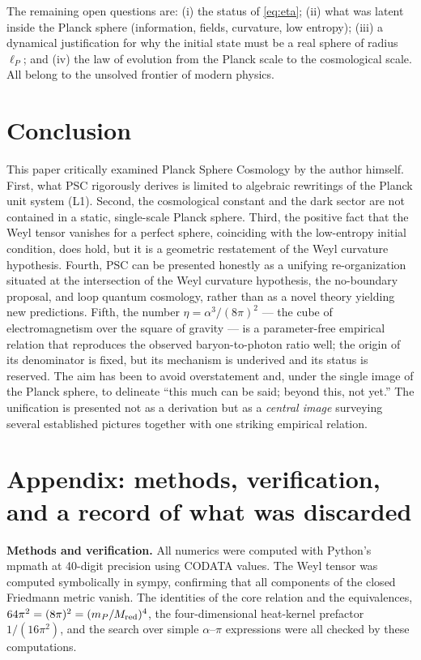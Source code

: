 \documentclass[11pt,a4paper]{article}
\newcommand{\eP}{\ell_P}
\begin{document}
The remaining open questions are: (i) the status of \eqref{eq:eta}; (ii) what was latent inside the Planck sphere (information, fields, curvature, low entropy); (iii) a dynamical justification for why the initial state must be a real sphere of radius $\eP$; and (iv) the law of evolution from the Planck scale to the cosmological scale. All belong to the unsolved frontier of modern physics.

\section{Conclusion}
This paper critically examined Planck Sphere Cosmology by the author himself. First, what PSC rigorously derives is limited to algebraic rewritings of the Planck unit system (L1). Second, the cosmological constant and the dark sector are not contained in a static, single-scale Planck sphere. Third, the positive fact that the Weyl tensor vanishes for a perfect sphere, coinciding with the low-entropy initial condition, does hold, but it is a geometric restatement of the Weyl curvature hypothesis. Fourth, PSC can be presented honestly as a unifying re-organization situated at the intersection of the Weyl curvature hypothesis, the no-boundary proposal, and loop quantum cosmology, rather than as a novel theory yielding new predictions. Fifth, the number $\eta=\alpha^3/(8\pi)^2$ --- the cube of electromagnetism over the square of gravity --- is a parameter-free empirical relation that reproduces the observed baryon-to-photon ratio well; the origin of its denominator is fixed, but its mechanism is underived and its status is reserved. The aim has been to avoid overstatement and, under the single image of the Planck sphere, to delineate ``this much can be said; beyond this, not yet.'' The unification is presented not as a derivation but as a \emph{central image} surveying several established pictures together with one striking empirical relation.

\section*{Appendix: methods, verification, and a record of what was discarded}
\textbf{Methods and verification.} All numerics were computed with Python's mpmath at 40-digit precision using CODATA values. The Weyl tensor was computed symbolically in sympy, confirming that all components of the closed Friedmann metric vanish. The identities of the core relation and the equivalences, $64\pi^2=(8\pi)^2=(m_P/M_{\rm red})^4$, the four-dimensional heat-kernel prefactor $1/(16\pi^2)$, and the search over simple $\alpha$--$\pi$ expressions were all checked by these computations.
\end{document}

